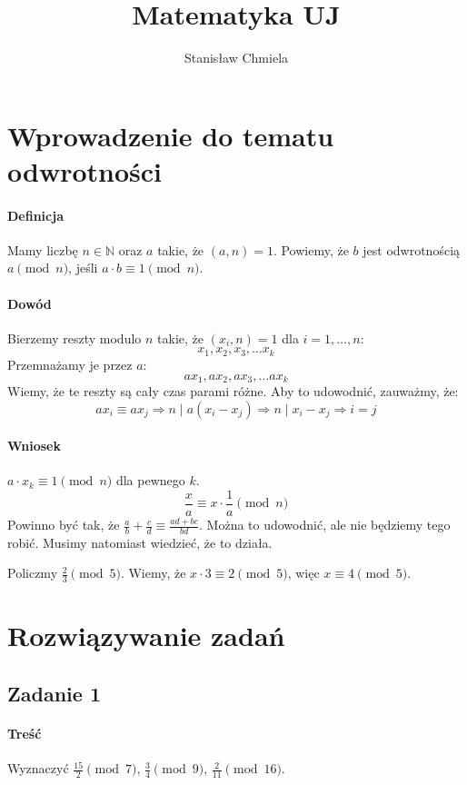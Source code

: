 \documentclass [a4paper, 10pt]{article}
\author{Stanisław Chmiela}
\title{Matematyka UJ}
\begin{document}
\maketitle
\section{Wprowadzenie do tematu odwrotności} %
\label{sec:wprowadzenie_do_tematu_odwrotno_ci}
\paragraph{Definicja} Mamy liczbę $n\in\mathbb{N}$ oraz $a$ takie, że $(a,n) = 1$. Powiemy, że $b$ jest odwrotnością $a\pmod n$, jeśli $a\cdot b\equiv 1\pmod n$.
\paragraph{Dowód} Bierzemy reszty modulo $n$ takie, że $(x_i, n) = 1$ dla $i=1,\dots,n$:
\[
    x_1, x_2, x_3,\dots x_k
\]
Przemnażamy je przez $a$:
\[
    ax_1, ax_2, ax_3,\dots ax_k
\]
Wiemy, że te reszty są cały czas parami różne. Aby to udowodnić, zauważmy, że:
\[
    ax_i \equiv ax_j \Rightarrow n\mid a\left(x_i-x_j\right) \Rightarrow n\mid x_i-x_j \Rightarrow i = j
\]
\paragraph{Wniosek} $a\cdot x_k \equiv 1\pmod n$ dla pewnego $k$.
\[
    \frac{x}{a} \equiv x\cdot \frac1{a} \pmod n
\]
Powinno być tak, że $\frac{a}{b} +\frac{c}{d} \equiv \frac{ad+bc}{bd}$. Można to udowodnić, ale nie będziemy tego robić. Musimy natomiast wiedzieć, że to działa.

Policzmy $\frac23 \pmod 5$.
Wiemy, że $x\cdot 3 \equiv 2 \pmod 5$, więc $x\equiv4\pmod 5$.
\section{Rozwiązywanie zadań} %
\label{sec:rozwi_zywanie_zada_}
    \subsection{Zadanie 1} %
    \label{sub:zadanie_1}
        \paragraph{Treść} Wyznaczyć $\frac{15}2\pmod 7$, $\frac34\pmod 9$, $\frac2{11}\pmod {16}$.
\end{document}
